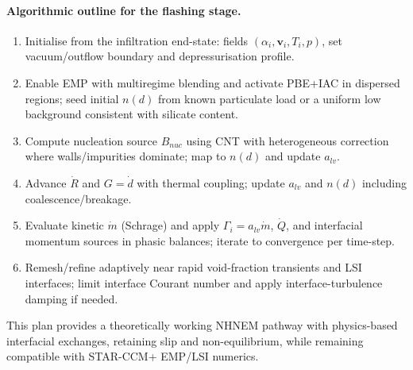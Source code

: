 \paragraph{Algorithmic outline for the flashing stage.}
\begin{enumerate}
  \item Initialise from the infiltration end-state: fields \((\alpha_i,\boldsymbol{v}_i,T_i,p)\), set vacuum/outflow boundary and depressurisation profile.%
  \item Enable EMP with multiregime blending and activate PBE+IAC in dispersed regions; seed initial \(n(d)\) from known particulate load or a uniform low background consistent with silicate content.%
  \item Compute nucleation source \(B_{nuc}\) using CNT with heterogeneous correction where walls/impurities dominate; map to \(n(d)\) and update \(a_{lv}\).%
  \item Advance \(\dot{R}\) and \(G=\dot{d}\) with thermal coupling; update \(a_{lv}\) and \(n(d)\) including coalescence/breakage.%
  \item Evaluate kinetic \(\dot{m}\) (Schrage) and apply \(\Gamma_i=a_{lv}\dot{m}\), \(\dot{Q}\), and interfacial momentum sources in phasic balances; iterate to convergence per time-step.%
  \item Remesh/refine adaptively near rapid void-fraction transients and LSI interfaces; limit interface Courant number and apply interface-turbulence damping if needed.%
\end{enumerate}

This plan provides a theoretically working 
NHNEM pathway with physics-based interfacial exchanges, retaining slip 
and non-equilibrium, while remaining compatible with STAR-CCM+ EMP/LSI numerics.%
